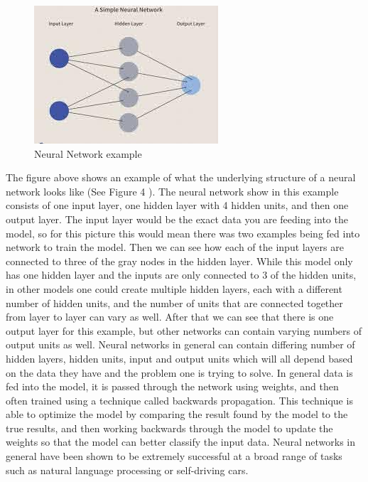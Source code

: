 \documentclass[12pt]{article}
\begin{document}
\begin{figure}

{\centering \includegraphics[width=0.75\linewidth,height=0.25\textheight]{images/neural_net} 

}

\caption{Neural Network example}\label{fig:sample-fig5}
\end{figure}

The figure above shows an example of what the underlying structure of a
neural network looks like (See Figure 4 \citet{Investopedia}). The
neural network show in this example consists of one input layer, one
hidden layer with 4 hidden units, and then one output layer. The input
layer would be the exact data you are feeding into the model, so for
this picture this would mean there was two examples being fed into
network to train the model. Then we can see how each of the input layers
are connected to three of the gray nodes in the hidden layer. While this
model only has one hidden layer and the inputs are only connected to 3
of the hidden units, in other models one could create multiple hidden
layers, each with a different number of hidden units, and the number of
units that are connected together from layer to layer can vary as well.
After that we can see that there is one output layer for this example,
but other networks can contain varying numbers of output units as well.
Neural networks in general can contain differing number of hidden
layers, hidden units, input and output units which will all depend based
on the data they have and the problem one is trying to solve. In general
data is fed into the model, it is passed through the network using
weights, and then often trained using a technique called backwards
propagation. This technique is able to optimize the model by comparing
the result found by the model to the true results, and then working
backwards through the model to update the weights so that the model can
better classify the input data. Neural networks in general have been
shown to be extremely successful at a broad range of tasks such as
natural language processing or self-driving cars.
\end{document}
